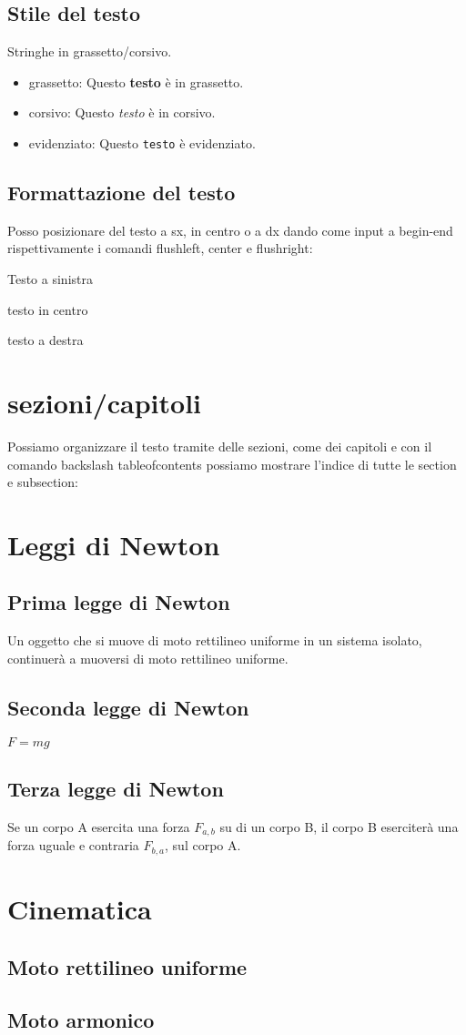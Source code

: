 \documentclass[11pt]{article}
\begin{document}
\subsection{Stile del testo}
Stringhe in grassetto/corsivo.
\begin{itemize}
\item grassetto: Questo \textbf{testo} è in grassetto.
\item corsivo: Questo \textit{testo} è in corsivo.
\item evidenziato: Questo \texttt{testo} è evidenziato.
\end{itemize}
\subsection{Formattazione del testo}
Posso posizionare del testo a sx, 
in centro o a dx dando come input a begin-end rispettivamente i comandi flushleft, 
center e flushright: 
\\
\begin{flushleft}
    Testo a sinistra
\end{flushleft}
\begin{center}
    testo in centro
\end{center}
\begin{flushright}
    testo a destra
\end{flushright}
\section{sezioni/capitoli}
Possiamo organizzare il testo tramite delle sezioni, come dei capitoli e con il comando backslash 
tableofcontents possiamo mostrare l'indice di tutte le section e subsection:\\
\section{Leggi di Newton}
    \subsection{Prima legge di Newton}
    Un oggetto che si muove di moto rettilineo uniforme in un sistema isolato, continuerà a muoversi di moto rettilineo uniforme.
    \subsection{Seconda legge di Newton}
    $F=mg$
    \subsection{Terza legge di Newton}
    Se un corpo A esercita una forza $F_{a,b}$ su di un corpo B, il corpo B eserciterà 
    una forza uguale e contraria $F_{b,a}$, sul corpo A.
\section{Cinematica}
    \subsection{Moto rettilineo uniforme}
    \subsection{Moto armonico}
\end{document}
